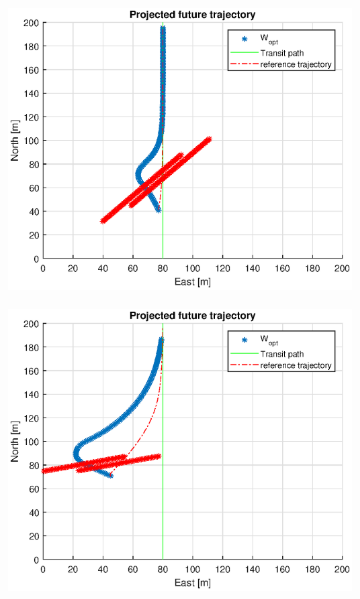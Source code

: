 \begin{figure}
\begin{subfigure}[b]{0.499\textwidth}
    \end{subfigure}
    \hfill
    \\
    \begin{subfigure}[b]{0.49\textwidth}
        \centering
        \includegraphics[width=\textwidth]{Images/Figures/sving_GW/Simple1_f999_Frame3}
    \end{subfigure}
    \hfill
    \begin{subfigure}[b]{0.499\textwidth}
        \centering
        \includegraphics[width=\textwidth]{Images/Figures/sving_GW/Simple1_f999_Frame4}

\end{subfigure}
\end{figure}
